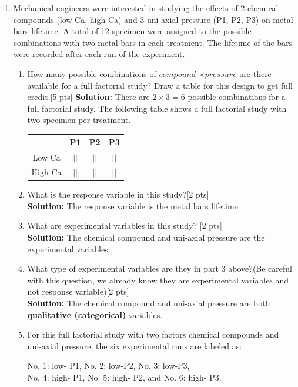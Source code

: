 \documentclass[11pt]{article}\usepackage[]{graphicx}\usepackage[]{color}
\begin{document}
\begin{enumerate}
\item  Mechanical engineers were interested in studying the effects of 2 chemical compounds 
	(low Ca, high Ca) and 3 uni-axial pressure (P1, P2, P3) on metal bars lifetime. A total of 12 specimen were assigned to the possible combinations with two metal bars in each treatment. The lifetime of the bars were recorded after each run of the experiment. 
\begin{enumerate}
	\item How many possible combinations of $compound$ $\times{ pressure}$ are there available for a full factorial study? Draw a table for this design to get full credit.[5 pts]
\textbf{Solution:} There are $2\times{3} = 6$ possible combinations for a full factorial study. The following table shows a full factorial study with two specimen per treatment.
	\begin{center}
			\begin{tabular}{|c|c|c|c|}
				\hline
				& P1 & P2 &P3\\
				\hline
				Low Ca & $||$ &$||$ &$||$ \\
				\hline
				High Ca &$||$ &$||$ & $||$\\
				\hline
			\end{tabular}
	\end{center}
	
	\item What is the response variable in this study?[2 pts]\\
	\textbf{Solution:} The response variable is the metal bars lifetime
	\item What are experimental variables in this study? [2 pts]\\
	\textbf{Solution:} The chemical compound and uni-axial pressure are the experimental variables. 
	\item What type of experimental variables are they in part 3 above?(Be careful with this question, we already know they are experimental variables and not response variable)[2 pts]\\
	\textbf{Solution:} The chemical compound and uni-axial pressure are both \textbf{qualitative (categorical)} variables. 
	\item For this full factorial study with two factors chemical compounds and uni-axial pressure, the six experimental runs are labeled as:
	
	No. 1:  low- P1, \hspace{0.5cm} No. 2:  low-P2,
	\hspace{0.5cm} No. 3: low-P3, \\  No. 4:  high- P1,
	\hspace{0.5cm} No. 5:  high- P2, \hspace{0.1 cm}and
	\hspace{0.1cm} No. 6:  high- P3.
	

\end{enumerate}
\end{enumerate}
\end{document}
